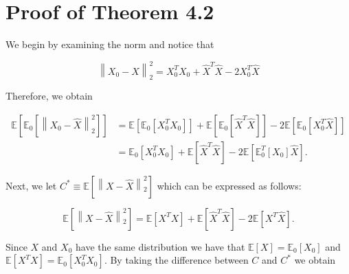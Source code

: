 \documentclass[]{book}
\theoremstyle{definition}
\theoremstyle{definition}
\theoremstyle{definition}
\theoremstyle{remark}
\begin{document}
\section{Proof of Theorem 4.2}\label{appendixoptim}

We begin by examining the norm and notice that

\begin{equation*}
  \left\| {X_0 - \hat{X}} \right\|_2^2 = {X_0^T}X_0 + \hat{X}^T \hat{X}  - 2X_0^T \hat{X}
\end{equation*}

Therefore, we obtain

\begin{align*}
  \mathbb{E}\left[ \mathbb{E}_0 \left[ \left\| {X_0 - \hat{X}} \right\|_2^2\right] \right] &=  \mathbb{E}\left[ \mathbb{E}_0 \left[{X_0^T}X_0\right] \right] +  \mathbb{E}\left[ \mathbb{E}_0 \left[\hat{X}^T \hat{X}\right] \right]  - 2 \mathbb{E}\left[ \mathbb{E}_0 \left[X_0^T \hat{X}\right] \right]\\
  &= \mathbb{E}_0 \left[{X_0^T}X_0\right]  +  \mathbb{E}\left[ \hat{X}^T \hat{X}\right]   - 2 \mathbb{E}\left[ \mathbb{E}_0^T \left[X_0\right] \hat{X} \right].
\end{align*}

Next, we let
\({C^*} \equiv \mathbb{E}\left[ {\left\| {X - \hat X} \right\|_2^2} \right]\)
which can be expressed as follows:

\begin{equation*}
  \mathbb{E}\left[  \left\| {X - \hat{X}} \right\|_2^2\right] = \mathbb{E} \left[{X^T}X\right]  +  \mathbb{E}\left[ \hat{X}^T \hat{X}\right]   - 2 \mathbb{E}\left[  X^T \hat{X} \right].
\end{equation*}

Since \(X\) and \(X_0\) have the same distribution we have that
\(\mathbb{E}[X] = \mathbb{E}_0 [X_0]\) and
\(\mathbb{E}[X^T X] = \mathbb{E}_0 [X_0^T X_0]\). By taking the
difference between \(C\) and \(C^*\) we obtain
\end{document}
